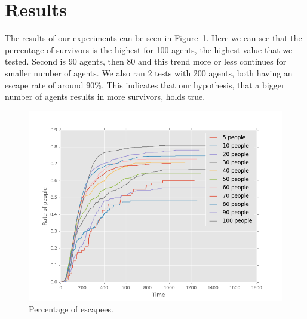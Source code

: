 \documentclass[a4paper]{article}
\begin{document}

\section{Results}
\label{sec:results}
The results of our experiments can be seen in Figure~\ref{fig:escape}. Here we can see that the percentage of survivors is the highest for 100 agents, the highest value that we tested. Second is 90 agents, then 80 and this trend more or less continues for smaller number of agents. We also ran 2 tests with 200 agents, both having an escape rate of around 90\%. This indicates that our hypothesis, that a bigger number of agents results in more survivors, holds true. 

\begin{figure}[ht]
  \centering
  \includegraphics[width=\linewidth]{escaperate.png}
  \caption{Percentage of escapees.}
  \label{fig:escape}
\end{figure}
\end{document}
